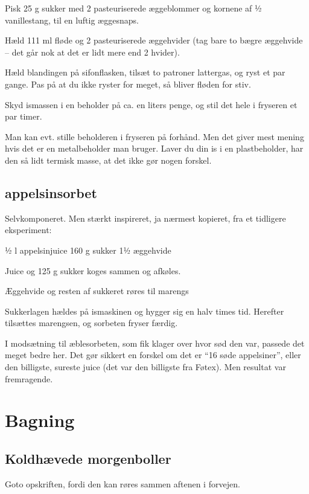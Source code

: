 \documentclass[
]{book}
\begin{document}
Pisk 25 g sukker med 2 pasteuriserede æggeblommer og kornene af ½ vanillestang, til en luftig æggesnaps.

Hæld 111 ml fløde og 2 pasteuriserede æggehvider (tag bare to bægre æggehvide -- det går nok at det er lidt mere end 2 hvider).

Hæld blandingen på sifonflasken, tilsæt to patroner lattergas, og ryst et par gange. Pas på at du ikke ryster for meget, så bliver fløden for stiv.

Skyd ismassen i en beholder på ca. en liters penge, og stil det hele i fryseren et par timer.

Man kan evt. stille beholderen i fryseren på forhånd. Men det giver mest mening hvis det er en metalbeholder man bruger. Laver du din is i en plastbeholder, har den så lidt termisk masse, at det ikke gør nogen forskel.

\section{appelsinsorbet}\label{appelsinsorbet}

Selvkomponeret. Men stærkt inspireret, ja nærmest kopieret, fra et tidligere eksperiment:

½ l appelsinjuice
160 g sukker
1½ æggehvide

Juice og 125 g sukker koges sammen og afkøles.~

Æggehvide og resten af sukkeret røres til marengs

Sukkerlagen hældes på ismaskinen og hygger sig en halv times tid. Herefter tilsættes marengsen, og sorbeten fryser færdig.

I modsætning til æblesorbeten, som fik klager over hvor sød den var, passede det meget bedre her. Det gør sikkert en forskel om det er ``16 søde appelsiner'', eller den billigste, sureste juice (det var den billigste fra Føtex). Men resultat var fremragende.

\chapter{Bagning}\label{bagning}

\section{Koldhævede morgenboller}\label{koldhuxe6vede-morgenboller}

Goto opskriften, fordi den kan røres sammen aftenen i forvejen.
\end{document}
